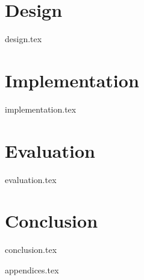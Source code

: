 \documentclass{l4proj}
\begin{document}
\chapter{Design}\label{des}
{design.tex}

\chapter{Implementation}\label{imp}
{implementation.tex}

\chapter{Evaluation} \label{eval}
{evaluation.tex}

\chapter{Conclusion}\label{conc}
{conclusion.tex}

%
% 
\begin{appendices}
{appendices.tex}
\end{appendices}






% 
% 
\end{document}
